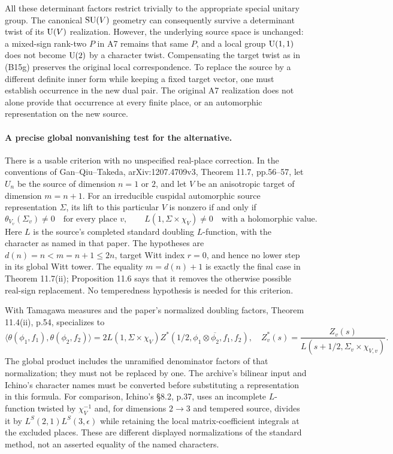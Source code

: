 \documentclass[11pt]{article}
\theoremstyle{definition}\newtheorem{definition}[theorem]{Definition}\newtheorem{remark}[theorem]{Remark}
\begin{document}
All these determinant factors restrict trivially to the appropriate special unitary group. The canonical $\operatorname{SU}(V)$ geometry can consequently survive a determinant twist of its $\operatorname{U}(V)$ realization. However, the underlying source space is unchanged: a mixed-sign rank-two $P$ in A7 remains that same $P$, and a local group $\operatorname{U}(1,1)$ does not become $\operatorname{U}(2)$ by a character twist. Compensating the target twist as in (B15g) preserves the original local correspondence. To replace the source by a different definite inner form while keeping a fixed target vector, one must establish occurrence in the new dual pair. The original A7 realization does not alone provide that occurrence at every finite place, or an automorphic representation on the new source.

\paragraph{A precise global nonvanishing test for the alternative.}
There is a usable criterion with no unspecified real-place correction. In the conventions of Gan--Qiu--Takeda, arXiv:1207.4709v3, Theorem 11.7, pp.56--57, let $U_n$ be the source of dimension $n=1$ or $2$, and let $V$ be an anisotropic target of dimension $m=n+1$. For an irreducible cuspidal automorphic source representation $\Sigma$, its lift to this particular $V$ is nonzero if and only if
\[
 \theta_{V_v}(\Sigma_v)\ne0\quad\text{for every place }v,
 \qquad L(1,\Sigma\times\chi_V)\ne0
       \quad\text{with a holomorphic value}.
 \tag{B15i}
\]
Here $L$ is the source's completed standard doubling $L$-function, with the character as named in that paper. The hypotheses are $d(n)=n<m=n+1\leq2n$, target Witt index $r=0$, and hence no lower step in its global Witt tower. The equality $m=d(n)+1$ is exactly the final case in Theorem 11.7(ii); Proposition 11.6 says that it removes the otherwise possible real-sign replacement. No temperedness hypothesis is needed for this criterion.

With Tamagawa measures and the paper's normalized doubling factors, Theorem 11.4(ii), p.54, specializes to
\[
 \langle\theta(\phi_1,f_1),\theta(\phi_2,f_2)\rangle
 =2L(1,\Sigma\times\chi_V)
       Z^*(1/2,\phi_1\otimes\overline{\phi_2},f_1,f_2),
 \quad
 Z_v^*(s)=\frac{Z_v(s)}{L(s+1/2,\Sigma_v\times\chi_{V,v})}.
 \tag{B15j}
\]
The global product includes the unramified denominator factors of that normalization; they must not be replaced by one. The archive's bilinear input and Ichino's character names must be converted before substituting a representation in this formula. For comparison, Ichino's \S8.2, p.37, uses an incomplete $L$-function twisted by $\chi_V^{-1}$ and, for dimensions $2\to3$ and tempered source, divides it by $L^S(2,1)L^S(3,\epsilon)$ while retaining the local matrix-coefficient integrals at the excluded places. These are different displayed normalizations of the standard method, not an asserted equality of the named characters.
\end{document}
